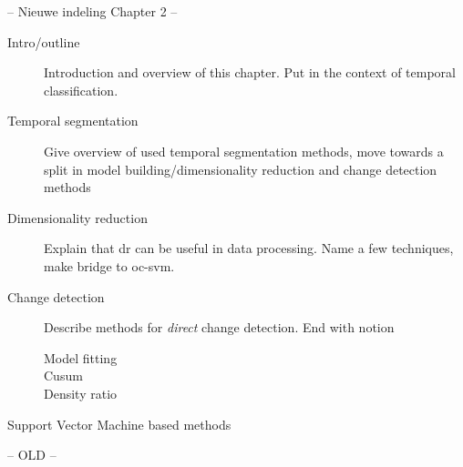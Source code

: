 -- Nieuwe indeling Chapter 2 --

\begin{description}
  \item[Intro/outline] Introduction and overview of this chapter. Put in the context of temporal classification.
  \item[Temporal segmentation] Give overview of used temporal segmentation methods, move towards a split in model building/dimensionality reduction and change detection methods
  \item[Dimensionality reduction] Explain that \gls{dr} can be useful in data processing. Name a few techniques, make bridge to \gls{oc-svm}.
  \item[Change detection] Describe methods for \emph{direct} change detection. End with notion
    \begin{description}
      \item[Model fitting]
      \item[Cusum]
      \item[Density ratio]
    \end{description}
  \item[Support Vector Machine based methods]

\end{description}





-- OLD --






